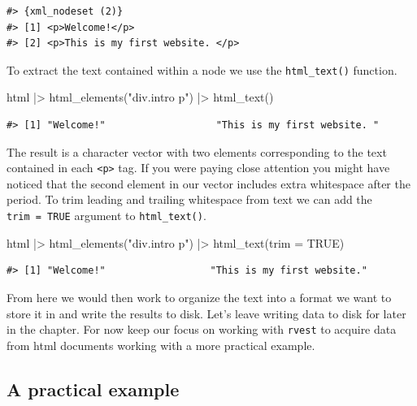 \documentclass[
  letterpaper,
]{latex/krantz}
\newenvironment{Shaded}{\begin{snugshade}}{\end{snugshade}}
\newcommand{\AttributeTok}[1]{\textcolor[rgb]{0.40,0.45,0.13}{#1}}
\newcommand{\ConstantTok}[1]{\textcolor[rgb]{0.56,0.35,0.01}{#1}}
\newcommand{\FunctionTok}[1]{\textcolor[rgb]{0.28,0.35,0.67}{#1}}
\newcommand{\NormalTok}[1]{\textcolor[rgb]{0.00,0.23,0.31}{#1}}
\newcommand{\SpecialCharTok}[1]{\textcolor[rgb]{0.37,0.37,0.37}{#1}}
\newcommand{\StringTok}[1]{\textcolor[rgb]{0.13,0.47,0.30}{#1}}
\begin{document}
\begin{verbatim}
#> {xml_nodeset (2)}
#> [1] <p>Welcome!</p>
#> [2] <p>This is my first website. </p>
\end{verbatim}

To extract the text contained within a node we use the
\texttt{html\_text()} function.

\begin{Shaded}
\begin{Highlighting}[]
\NormalTok{html }\SpecialCharTok{|\textgreater{}} 
  \FunctionTok{html\_elements}\NormalTok{(}\StringTok{"div.intro p"}\NormalTok{) }\SpecialCharTok{|\textgreater{}} 
  \FunctionTok{html\_text}\NormalTok{()}
\end{Highlighting}
\end{Shaded}

\begin{verbatim}
#> [1] "Welcome!"                   "This is my first website. "
\end{verbatim}

The result is a character vector with two elements corresponding to the
text contained in each \texttt{\textless{}p\textgreater{}} tag. If you
were paying close attention you might have noticed that the second
element in our vector includes extra whitespace after the period. To
trim leading and trailing whitespace from text we can add the
\texttt{trim\ =\ TRUE} argument to \texttt{html\_text()}.

\begin{Shaded}
\begin{Highlighting}[]
\NormalTok{html }\SpecialCharTok{|\textgreater{}} 
  \FunctionTok{html\_elements}\NormalTok{(}\StringTok{"div.intro p"}\NormalTok{) }\SpecialCharTok{|\textgreater{}} 
  \FunctionTok{html\_text}\NormalTok{(}\AttributeTok{trim =} \ConstantTok{TRUE}\NormalTok{)}
\end{Highlighting}
\end{Shaded}

\begin{verbatim}
#> [1] "Welcome!"                  "This is my first website."
\end{verbatim}

From here we would then work to organize the text into a format we want
to store it in and write the results to disk. Let's leave writing data
to disk for later in the chapter. For now keep our focus on working with
\texttt{rvest} to acquire data from html documents working with a more
practical example.

\hypertarget{a-practical-example}{%
\subsection{A practical example}\label{a-practical-example}}
\end{document}
